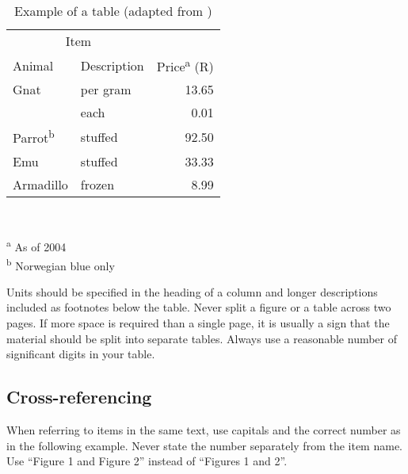\documentclass[a5paper, 10pt]{article}
\begin{document}
\begin{table}[htbp]
  \centering
  \caption{Example of a table (adapted from \citet{fear})}
  \label{tab:tabexample}
  \begin{minipage}{0.5\textwidth}
    \begin{centering}
      \begin{tabular}{@{}llr@{}} \toprule 
        \multicolumn{2}{c}{Item}                                               \\ 
        \cmidrule(r){1-2} 
        Animal                    & Description & Price\textsuperscript{a} (R) \\ 
        \midrule 
        Gnat                      & per gram    & \num{13.65}                  \\ 
                                  & each        & \num{0.01}                   \\ 
        Parrot\textsuperscript{b} & stuffed     & \num{92.50}                  \\ 
        Emu                       & stuffed     & \num{33.33}                  \\ 
        Armadillo                 & frozen      & \num{8.99}                   \\ 
        \bottomrule 
      \end{tabular}                                                            \\
    \end{centering} 
    \vspace{1em}
    \textsuperscript{a} As of 2004                                             \\
    \textsuperscript{b} Norwegian blue only
  \end{minipage}
\end{table}

Units should be specified in the heading of a column and longer descriptions included as footnotes below the table.
Never split a figure or a table across two pages.
If more space is required than a single page, it is usually a sign that the material should be split into separate tables.
Always use a reasonable number of significant digits in your table.

\subsection{Cross-referencing}
When referring to items in the same text, use capitals and the
correct number as in the following example. 
Never state the number separately from the item name. 
Use ``Figure 1 and Figure 2'' instead of ``Figures 1 and 2''.
\end{document}
